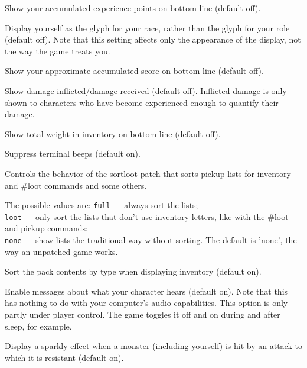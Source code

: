 \item[\ib{showexp}]
Show your accumulated experience points on bottom line (default off).

\item[\ib{showrace}]
Display yourself as the glyph for your race, rather than the glyph
for your role (default off).  Note that this setting affects only
the appearance of the display, not the way the game treats you.

\item[\ib{showscore}]
Show your approximate accumulated score on bottom line (default off).

\item[\ib{showdmg}]
Show damage inflicted/damage received (default off).  Inflicted
damage is only shown to characters who have become experienced
enough to quantify their damage.

\item[\ib{showweight}]
Show total weight in inventory on bottom line (default off).

\item[\ib{silent}]
Suppress terminal beeps (default on).

\item[\ib{sortloot}]
Controls the behavior of the sortloot patch that sorts pickup lists for
inventory and \#loot commands and some others.

The possible values are:
{\tt full} --- always sort the lists;\\
{\tt loot} --- only sort the lists that don't use inventory
       letters, like with the \#loot and pickup commands;\\
{\tt none} --- show lists the traditional way without sorting.
The default is 'none', the way an unpatched game works.


\item[\ib{sortpack}]
Sort the pack contents by type when displaying inventory (default on).

\item[\ib{sound}]
Enable messages about what your character hears (default on).
Note that this has nothing to do with your computer's audio capabilities.
This option is only partly under player control.  The game toggles it
off and on during and after sleep, for example.

\item[\ib{sparkle}]
Display a sparkly effect when a monster (including yourself) is hit by an
attack to which it is resistant (default on).

